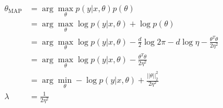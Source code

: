 \begin{answer}
    $$
    \begin{aligned}
        \theta_{\text{MAP}} &=\arg\max_\theta p(y|x, \theta) p(\theta)\\
        &=\arg\max_\theta\log{p(y|x, \theta)} + \log{p(\theta)}\\
        &=\arg\max_\theta\log{p(y|x, \theta)} - \frac{d}{2}\log{2\pi}- d\log{\eta} - \frac{\theta^T\theta}{2\eta^2}\\
        &=\arg\max_\theta\log{p(y|x, \theta)} - \frac{\theta^T\theta}{2\eta^2}\\
        &=\arg\min_\theta -\log{p(y|x, \theta)} + \frac{||\theta||_2^2}{2\eta^2}\\
        \lambda &= \frac{1}{2\eta^2}
    \end{aligned}
    $$
\end{answer}
